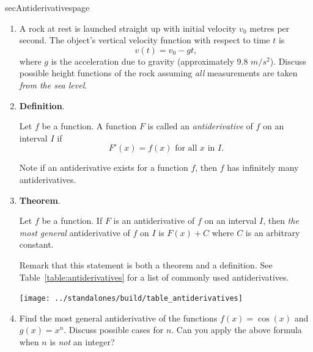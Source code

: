 \documentclass[../main]{subfiles}
\begin{document}
%
%
\begin{outline}{sec}{Antiderivatives}{page} \label{outline:antiderivatives}
  \begin{enumerate}
    \item A rock at rest is launched straight up with initial velocity \(v_{0}\) metres per second. The object's vertical velocity function with respect to time \(t\) is
      \begin{equation} \label{eq:rock}
        v(t) = v_{0} - g t, 
      \end{equation}
      where \(g\) is the acceleration due to gravity (approximately 9.8 \(m/s^{2}\)). Discuss possible height functions of the rock assuming \emph{all} measurements are taken \emph{from the sea level}.

    \item \textbf{Definition}.
      \begin{mdframed}[style=simple]
        Let \(f\) be a function. A function \(F\) is called an \emph{antiderivative} of \(f\) on an interval \(I\) if 
        \[ F'(x) = f(x) \text{ for all } x \text{ in } I. \]
      \end{mdframed}

      Note if an antiderivative exists for a function \(f\), then \(f\) has infinitely many antiderivatives. 

    \item \textbf{Theorem}.
      \begin{mdframed}[style=simple]
        Let \(f\) be a function. If \(F\) is an antiderivative of \(f\) on an interval \(I\), then \emph{the most general} antiderivative of \(f\) on \(I\) is \(F(x) + C\) where \(C\) is an arbitrary constant.
      \end{mdframed}

      Remark that this statement is both a theorem and a definition. See Table~\ref{table:antiderivatives} for a list of commonly used antiderivatives.
      \begin{table}[h]
        \centering
        \texttt{[image: ../standalones/build/table\_antiderivatives]}
        \caption{A list of common antiderivatives.\\Filing in the third column is an additional exercise.}
        \label{table:antiderivatives}
      \end{table}

    \item Find the most general antiderivative of the functions \(f(x) = \cos(x)\) and \(g(x) = x^{n}\). Discuss possible cases for \(n\).  Can you apply the above formula when \(n\) is \emph{not} an integer?


\end{enumerate}
\end{outline}
\end{document}
